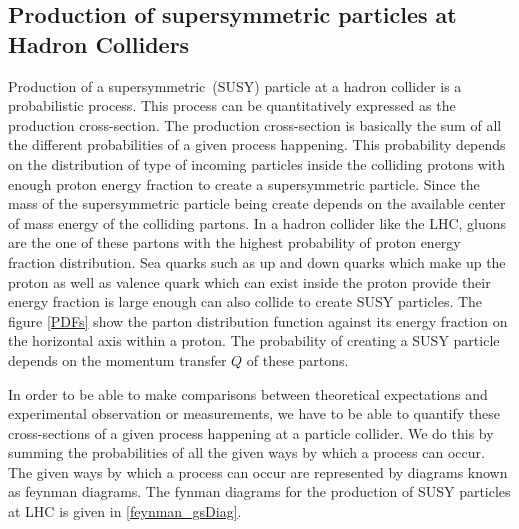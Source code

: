 {\subsection{Production of supersymmetric particles at Hadron Colliders}
Production of a supersymmetric~(SUSY) particle at a hadron collider is a probabilistic process. This process can be quantitatively expressed as the production cross-section. The production cross-section is basically the sum of all the different probabilities of a given process happening. This probability depends on the distribution of type of incoming particles inside the colliding protons with enough proton energy fraction to create a supersymmetric particle. Since the mass of the supersymmetric particle being create depends on the available center of mass energy of the colliding partons. In a hadron collider like the LHC, gluons are the one of these partons with the highest probability of proton energy fraction distribution. Sea quarks such as up and down quarks which make up the proton as well as valence quark which can exist inside the proton provide their energy fraction is large enough can also collide to create SUSY particles. The figure \eqref{PDFs} show the parton distribution function against its energy fraction on the horizontal axis within a proton. The probability of creating a SUSY particle depends on the momentum transfer $Q$ of these partons.

\begin{center}\label{PDFs}
\label{fig:PDFs}
\end{center}
In order to be able to make comparisons between theoretical expectations and experimental observation or measurements, we have to be able to quantify these cross-sections of a given process happening  at a particle collider. We do this by summing the probabilities of all the given ways by which a process can occur. The given ways by which a process can occur are represented by diagrams known as feynman diagrams. The fynman diagrams for the production of SUSY particles at LHC is given in \eqref{feynman_gsDiag}. 

}
